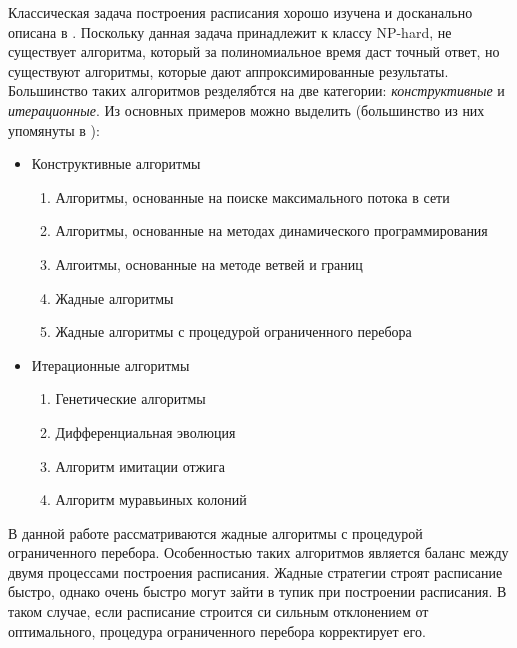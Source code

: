 Классическая задача построения расписания хорошо изучена и досканально описана в \cite{Coffman}. Поскольку данная задача принадлежит к классу NP-hard, не существует алгоритма, который за полиномиальное время даст точный ответ, но существуют алгоритмы, которые дают аппроксимированные результаты. Большинство таких алгоритмов резделябтся на две категории: \textit{конструктивные} и \textit{итерационные}. Из основных примеров можно выделить (большинство из них упомянуты в \cite{Kostenko_2017}):
\begin{itemize}
    \item Конструктивные алгоритмы
    \begin{enumerate}
        \item Алгоритмы, основанные на поиске максимального потока в сети
        \item Алгоритмы, основанные на методах динамического программирования
        \item Алгоитмы, основанные на методе ветвей и границ
        \item Жадные алгоритмы
        \item Жадные алгоритмы с процедурой ограниченного перебора
    \end{enumerate}
    \item Итерационные алгоритмы
    \begin{enumerate}
        \item Генетические алгоритмы
        \item Дифференциальная эволюция
        \item Алгоритм имитации отжига
        \item Алгоритм муравьиных колоний
    \end{enumerate}
\end{itemize}

В данной работе рассматриваются жадные алгоритмы с процедурой ограниченного перебора. Особенностью таких алгоритмов является баланс между двумя процессами построения расписания. Жадные стратегии строят расписание быстро, однако очень быстро могут зайти в тупик при построении расписания. В таком случае, если расписание строится си сильным отклонением от оптимального, процедура ограниченного перебора корректирует его.